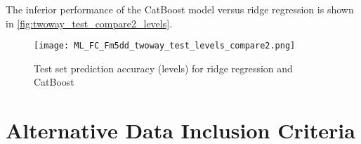 The inferior performance of the CatBoost model versus ridge regression is shown in \autoref{fig:twoway_test_compare2_levels}.
\begin{figure}[H]
    \centering
    \texttt{[image: ML\_FC\_Fm5dd\_twoway\_test\_levels\_compare2.png]}
    \caption{Test set prediction accuracy (levels) for ridge regression and CatBoost}
    \label{fig:twoway_test_compare2_levels}
\end{figure}

\section{Alternative Data Inclusion Criteria}\label{app:altcriteria}
